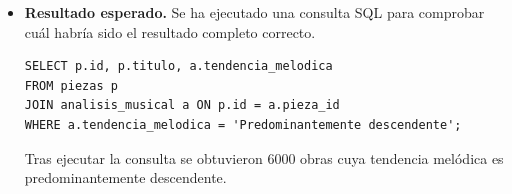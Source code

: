 \begin{itemize}
*   **IE-2019-D-HLS-001** (Compás: 4/4, Tonalidad: G major)
*   **IE-2019-D-HLS-002** (Compás: 4/4, Tonalidad: G major, BPM: 62)
*   **IE-2019-D-HLS-003** (Compás: 4/4, Tonalidad: G major, BPM: 140)
*   **IE-2019-D-HLS-006** (Compás: 12/8, Tonalidad: B minor)
*   **IE-2019-D-HLS-008** (Compás: 3/4, Tonalidad: G major)
*   **IE-2019-D-HLS-010** (Compás: 4/4, Tonalidad: G major, BPM: 128)
*   **IE-2019-D-HLS-012** (Compás: 3/2, Tonalidad: G minor, BPM: 60)
*   **IE-2019-D-HLS-013** (Compás: 4/4, Tonalidad: G major, BPM: 140)
*   **IE-2019-D-HLS-016** (Compás: 4/4, Tonalidad: C major)
*   **IE-2019-D-HLS-019** (Compás: 3/8, Tonalidad: G major)"
\item \textbf{Resultado esperado.} Se ha ejecutado una consulta SQL para comprobar cuál habría sido el resultado completo correcto.
    \begin{verbatim}
SELECT p.id, p.titulo, a.tendencia_melodica
FROM piezas p
JOIN analisis_musical a ON p.id = a.pieza_id
WHERE a.tendencia_melodica = 'Predominantemente descendente';
    \end{verbatim}    
    Tras ejecutar la consulta se obtuvieron 6000 obras cuya tendencia melódica es predominantemente descendente.

\end{itemize}

